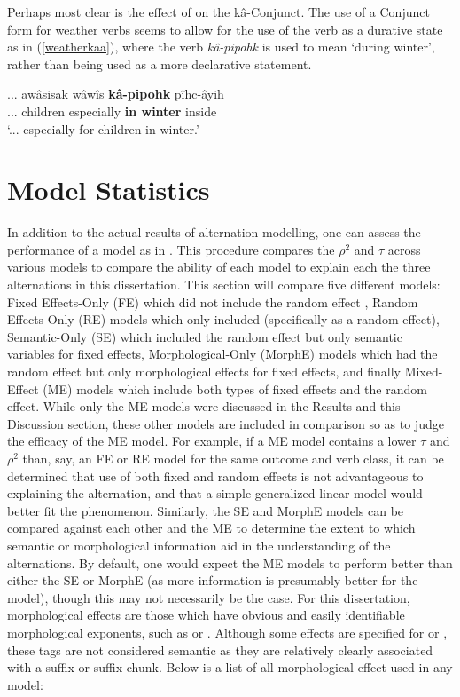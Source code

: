 Perhaps most clear is the effect of  on the kâ-Conjunct. The use of a Conjunct form for weather verbs seems to allow for the use of the verb as a durative state as in (\ref{weatherkaa}), where the verb \textit{kâ-pipohk} is used to mean `during winter', rather than being used as a more declarative statement.

\begin{exe}
\ex
\gll ... awâsisak wâwîs \textbf{kâ-pipohk} pîhc-âyih \\
     ... children especially \textbf{in winter} inside \\
\trans `... especially for children in winter.' \citep[137]{Minde1997kwayask}
\label{weatherkaa}
\end{exe}

\FloatBarrier


\section{Model Statistics}
In addition to the actual results of alternation modelling, one can assess the performance of a model as in \citet{arppe2008univariate}. This procedure compares the $\rho^{2}$ and $\tau$ across various models to compare the ability of each model to explain each the three alternations in this dissertation. This section will compare five different models: Fixed Effects-Only (FE) which did not include the random effect , Random Effects-Only (RE) models which only included  (specifically as a random effect), Semantic-Only (SE) which included the random effect but only semantic variables for fixed effects, Morphological-Only (MorphE) models which had the random effect but only morphological effects for fixed effects, and finally Mixed-Effect (ME) models which include both types of fixed effects and the random effect. While only the ME models were discussed in the Results and this Discussion section, these other models are included in comparison so as to judge the efficacy of the ME model. For example, if a ME model contains a lower $\tau$ and $\rho^{2}$ than, say, an FE or RE model for the same outcome and verb class, it can be determined that use of both fixed and random effects is not advantageous to explaining the alternation, and that a simple generalized linear model would better fit the phenomenon. Similarly, the SE and MorphE models can be compared against each other and the ME to determine the extent to which semantic or morphological information aid in the understanding of the alternations. By default, one would expect the ME models to perform better than either the SE or MorphE (as more information is presumably better for the model), though this may not necessarily be the case. For this dissertation, morphological effects are those which have obvious and easily identifiable morphological exponents, such as  or . Although some effects are specified for  or , these tags are not considered semantic as they are relatively clearly associated with a suffix or suffix chunk. Below is a list of all morphological effect used in any model:

